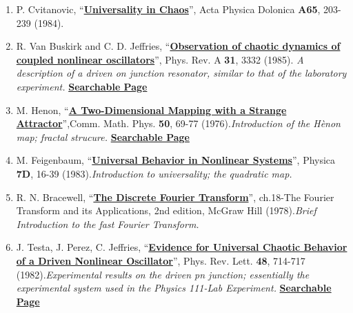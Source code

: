 \documentclass{../lab}
\begin{document}
\begin{enumerate}
    \item P. Cvitanovic, ``\href{http://physics111.lib.berkeley.edu/Physics111/Reprints/NLD/03-Universality\_in\_Chaos.pdf}{\textbf{Universality in Chaos}}'', Acta Physica Dolonica \textbf{A65}, 203-239 (1984).

    \item R. Van Buskirk and C. D. Jeffries, ``\href{http://link.aps.org/doi/10.1103/PhysRevA.31.3332}{\textbf{Observation of chaotic dynamics of coupled nonlinear oscillators}}'', Phys. Rev. A \textbf{31}, 3332 (1985). \emph{A description of a driven on junction resonator, similar to that of the laboratory experiment.} \href{http://physics111.lib.berkeley.edu/Physics111/Reprints/NLD/09-Observation\_of\_Chaotic\_Dynamics.pdf}{\textbf{Searchable Page}}

    \item M. Henon, ``\href{http://projecteuclid.org/DPubS?verb=Display&version=1.0&service=UI&handle=euclid.cmp/1103900150&page=record}{\textbf{A Two-Dimensional Mapping with a Strange Attractor}}'',Comm. Math. Phys. \textbf{50}, 69-77 (1976).\emph{Introduction of the Hènon map; fractal strucure.} \href{http://physics111.lib.berkeley.edu/Physics111/Reprints/NLD/06-A\_Two-Dimensional\_Mapping.pdf}{\textbf{Searchable Page}}

    \item M. Feigenbaum, ``\href{http://dx.doi.org/10.1016/0167-2789(83)90112-4}{\textbf{Universal Behavior in Nonlinear Systems}}'', Physica \textbf{7D}, 16-39 (1983).\emph{Introduction to universality; the quadratic map.}

    \item R. N. Bracewell, ``\href{http://physics111.lib.berkeley.edu/Physics111/Reprints/NLD/07-The\_Discrete\_Fourier\_Transform.pdf}{\textbf{The Discrete Fourier Transform}}'', ch.18-The Fourier Transform and its Applications, 2nd edition, McGraw Hill (1978).\emph{Brief Introduction to the fast Fourier Transform.}

    \item J. Testa, J. Perez, C. Jeffries, ``\href{http://prl.aps.org/abstract/PRL/v48/i11/p714\_1}{\textbf{Evidence for Universal Chaotic Behavior of a Driven Nonlinear Oscillator}}'', Phys. Rev. Lett. \textbf{48}, 714-717 (1982).\emph{Experimental results on the driven pn junction; essentially the experimental system used in the Physics 111-Lab Experiment.} \href{http://physics111.lib.berkeley.edu/Physics111/Reprints/NLD/08-Evidence\_for\_Universal\_Chaotic\_Behavior.pdf}{\textbf{Searchable Page}}


\end{enumerate}
\end{document}
